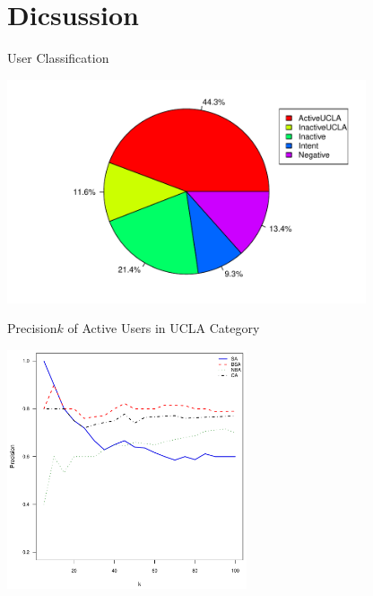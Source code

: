 \documentclass{beamer}
\begin{document}
\section{Dicsussion}
\begin{frame}{User Classification}
\begin{center}
  \includegraphics[width=300pt]{experiment/uc.pdf}
\end{center}
\end{frame}

\begin{frame}{Precision\at$k$ of Active Users in UCLA Category}
\begin{center}
  \includegraphics[width=200pt]{experiment/ap.pdf}
\end{center}
\end{frame}
\end{document}
